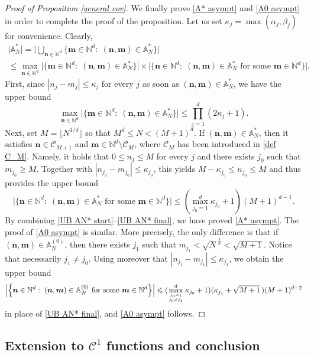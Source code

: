 \documentclass[a4paper,11pt]{article}
\numberwithin{equation}{section}
\theoremstyle{definition}
\newcommand{\eq}{\begin{equation}}
\newcommand{\qe}{\end{equation}}
\newcommand{\N}{\mathbb{N}}
\newcommand{\bs}{\boldsymbol}
\newcommand{\gfrac}[2]{\genfrac{}{}{0pt}{}{#1}{#2}}
\renewcommand{\leq}{\leqslant}
\renewcommand{\geq}{\geqslant}
\begin{document}
\begin{proof}[Proof of Proposition \ref{general cov}]
We finally prove \eqref{A* asympt} and \eqref{A0 asympt} in order to complete the proof of the proposition.
Let us set $\kappa_j=\max(\alpha_j,\beta_j)$ for convenience. Clearly,
\begin{multline}
\label{UB AN* start}
\big|\mathbb A_N^{*}\big| = \Big|\bigcup_{\bs n\in\N^d}\Big\{\bs m\in \N^d :\;  (\bs n,\bs m)\in\mathbb A_N^{*} \Big\}\Big|\\
\leq
\max_{\bs n\in \N^d}\Big|\Big\{\bs m\in \N^d :\;  (\bs n,\bs m)\in\mathbb A_N^{*} \Big\}\Big| \times \Big|\Big\{\bs n\in \N^d :\;   (\bs n,\bs m)\in\mathbb A_N^{*}  \mbox{ for some } \bs m\in\N^d\Big\}\Big|.
\end{multline}
First, since  $|n_j-m_j|\leq \kappa_j$ for every $j$ as soon as  $(\bs n,\bs m)\in \mathbb A_N^*$, we have the upper bound
\eq
\max_{\bs n\in \N^d}\Big|\Big\{\bs m\in \N^d :\;  (\bs n,\bs m)\in\mathbb A_N^{*} \Big\}\Big|\leq \prod_{j=1}^d (2\kappa_j+1).
\qe
Next,  set  $M=\lfloor N^{1/d}\rfloor$  so that $M^d\leq N< (M+1)^d$. If  $(\bs n,\bs m)\in \mathbb A_N^*$, then it satisfies  $\bs n\in \mathcal C_{M+1}$ and $\bs m\in\N^d\setminus\mathcal C_{M}$, where $\mathcal C_M$ has been introduced in \eqref{def C_M}. Namely, it holds that $0\leq n_j\leq M$ for every $j$ and there exists $j_0$ such that $m_{j_0}\geq M$. Together with $|n_{j_0}-m_{j_0}|\leq \kappa_{j_0}$, this yields $M-\kappa_{j_0}\leq n_{j_0}\leq M$ and thus provides the upper bound
\eq
\label{UB AN* final}
 \Big|\Big\{\bs n\in \N^d :\;   (\bs n,\bs m)\in\mathbb A_N^{*}  \mbox{ for some } \bs m\in\N^d\Big\}\Big|
\leq (\max_{{j_0}=1}^d\kappa_{j_0}+1) (M+1)^{d-1}.
\qe
By combining \eqref{UB AN* start}--\eqref{UB AN* final}, we have proved \eqref{A* asympt}.  The proof of  \eqref{A0 asympt} is similar. More precisely, the only difference is that if $(\bs n,\bs m)\in\mathbb A_N^{(0)}$, then there exists $j_1$ such that $m_{j_1}<\sqrt N^{\frac 1d}<\sqrt{M+1}$. Notice that necessarily $j_1\neq j_0$. Using moreover that $|n_{j_1}-m_{j_1}|\leq \kappa_{j_1}$, we  obtain the upper bound
\[
 \Big|\Big\{\bs n\in \N^d :\;   (\bs n,\bs m)\in\mathbb A_N^{(0)}  \mbox{ for some } \bs m\in\N^d\Big\}\Big|
\leq (\max_{\gfrac{j_0=1}{j_0\neq j_1}}^d\kappa_{j_0}+1) (\kappa_{j_1}+\sqrt{M+1}\,) (M+1)^{d-2}
\]
in place of \eqref{UB AN* final}, and  \eqref{A0 asympt} follows.
\end{proof}



\subsection{Extension to $\mathscr C^1$ functions and conclusion}
\end{document}
